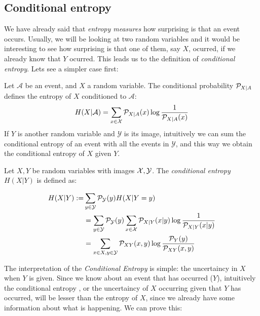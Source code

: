 \subsection*{Conditional entropy}
We have already said that \emph{entropy measures} how surprising is that an event occurs. Usually, we will be looking at two random variables and it would be interesting to see how surprising is that one of them, say $X$, ocurred, if we already know that $Y$ ocurred. This leads us to the definition of \emph{conditional entropy}. Lets see a simpler case first:

Let $\mathcal A$ be an event, and $X$ a random variable. The conditional probability $\mathcal{P}_{X|A}$ defines the entropy of $X$ conditioned to $\mathcal A$:
$$
H(X|\mathcal A) = \sum_{x \in \mathcal{X}} \mathcal{P}_{X|A}(x) \log\frac{1}{\mathcal{P}_{X|A}(x)}
$$
If $Y$ is another random variable and $\mathcal Y$ is its image, intuitively we can sum the conditional entropy of an event with all the events in $\mathcal Y$, and this way we obtain the conditional entropy of $X$ given $Y$.
\begin{ndef}
Let $X,Y$ be random variables with images $\mathcal{X},\mathcal Y$. The \emph{conditional entropy} $H(X | Y)$ is defined as:

\begin{equation*}
        \begin{split}
    H(X|Y) :=  & \sum_{y \in \mathcal Y} \mathcal{P}_{\mathcal Y}(y) H(X| Y = y)  \\ 
    & = \sum_{y \in \mathcal Y} \mathcal{P}_{\mathcal  Y}(y) \sum_{x \in \mathcal{X}} \mathcal{P}_{X | Y}(x|y)\log\frac{1}{\mathcal{P}_{X|Y}(x|y)}  \\
   & = \sum_{x \in X,y \in \mathcal Y}\mathcal{P}_{XY}(x,y)\log\frac{\mathcal{P}_Y(y)}{\mathcal{P}_{XY}(x,y)}
\end{split}
\end{equation*}



\end{ndef}

The interpretation of the \emph{Conditional Entropy} is simple: the uncertaincy in $X$ when $Y$ is given. Since we know about an event that has occurred ($Y$), intuitively the conditional entropy , or the uncertaincy of $X$ occurring given that $Y$ has occurred, will be lesser than the entropy of $X$, since we already have some information about what is happening. We can prove this:

